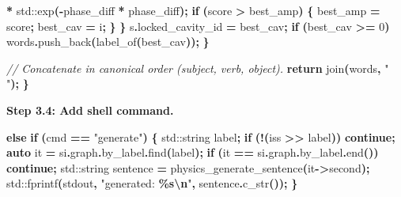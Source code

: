\documentclass[
  11pt,
  a4paper,
]{article}
\newenvironment{Shaded}{\begin{snugshade}}{\end{snugshade}}
\newcommand{\BuiltInTok}[1]{#1}
\newcommand{\CommentTok}[1]{\textcolor[rgb]{0.56,0.35,0.01}{\textit{#1}}}
\newcommand{\ControlFlowTok}[1]{\textcolor[rgb]{0.13,0.29,0.53}{\textbf{#1}}}
\newcommand{\DecValTok}[1]{\textcolor[rgb]{0.00,0.00,0.81}{#1}}
\newcommand{\KeywordTok}[1]{\textcolor[rgb]{0.13,0.29,0.53}{\textbf{#1}}}
\newcommand{\NormalTok}[1]{#1}
\newcommand{\OperatorTok}[1]{\textcolor[rgb]{0.81,0.36,0.00}{\textbf{#1}}}
\newcommand{\SpecialCharTok}[1]{\textcolor[rgb]{0.81,0.36,0.00}{\textbf{#1}}}
\newcommand{\StringTok}[1]{\textcolor[rgb]{0.31,0.60,0.02}{#1}}
\begin{document}
\begin{Shaded}
\begin{Highlighting}[]
                        \OperatorTok{*} \BuiltInTok{std::}\NormalTok{exp}\OperatorTok{({-}}\NormalTok{phase\_diff }\OperatorTok{*}\NormalTok{ phase\_diff}\OperatorTok{);}
            \ControlFlowTok{if} \OperatorTok{(}\NormalTok{score }\OperatorTok{\textgreater{}}\NormalTok{ best\_amp}\OperatorTok{)} \OperatorTok{\{}\NormalTok{ best\_amp }\OperatorTok{=}\NormalTok{ score}\OperatorTok{;}\NormalTok{ best\_cav }\OperatorTok{=}\NormalTok{ i}\OperatorTok{;} \OperatorTok{\}}
        \OperatorTok{\}}
\NormalTok{        s}\OperatorTok{.}\NormalTok{locked\_cavity\_id }\OperatorTok{=}\NormalTok{ best\_cav}\OperatorTok{;}
        \ControlFlowTok{if} \OperatorTok{(}\NormalTok{best\_cav }\OperatorTok{\textgreater{}=} \DecValTok{0}\OperatorTok{)}\NormalTok{ words}\OperatorTok{.}\NormalTok{push\_back}\OperatorTok{(}\NormalTok{label\_of}\OperatorTok{(}\NormalTok{best\_cav}\OperatorTok{));}
    \OperatorTok{\}}

    \CommentTok{// Concatenate in canonical order (subject, verb, object).}
    \ControlFlowTok{return}\NormalTok{ join}\OperatorTok{(}\NormalTok{words}\OperatorTok{,} \StringTok{" "}\OperatorTok{);}
\OperatorTok{\}}
\end{Highlighting}
\end{Shaded}

\textbf{Step 3.4: Add shell command.}

\begin{Shaded}
\begin{Highlighting}[]
\ControlFlowTok{else} \ControlFlowTok{if} \OperatorTok{(}\NormalTok{cmd }\OperatorTok{==} \StringTok{"generate"}\OperatorTok{)} \OperatorTok{\{}
    \BuiltInTok{std::}\NormalTok{string label}\OperatorTok{;}
    \ControlFlowTok{if} \OperatorTok{(!(}\NormalTok{iss }\OperatorTok{\textgreater{}\textgreater{}}\NormalTok{ label}\OperatorTok{))} \ControlFlowTok{continue}\OperatorTok{;}
    \KeywordTok{auto}\NormalTok{ it }\OperatorTok{=}\NormalTok{ si}\OperatorTok{.}\NormalTok{graph}\OperatorTok{.}\NormalTok{by\_label}\OperatorTok{.}\NormalTok{find}\OperatorTok{(}\NormalTok{label}\OperatorTok{);}
    \ControlFlowTok{if} \OperatorTok{(}\NormalTok{it }\OperatorTok{==}\NormalTok{ si}\OperatorTok{.}\NormalTok{graph}\OperatorTok{.}\NormalTok{by\_label}\OperatorTok{.}\NormalTok{end}\OperatorTok{())} \ControlFlowTok{continue}\OperatorTok{;}
    \BuiltInTok{std::}\NormalTok{string sentence }\OperatorTok{=}\NormalTok{ physics\_generate\_sentence}\OperatorTok{(}\NormalTok{it}\OperatorTok{{-}\textgreater{}}\NormalTok{second}\OperatorTok{);}
    \BuiltInTok{std::}\NormalTok{fprintf}\OperatorTok{(}\NormalTok{stdout}\OperatorTok{,} \StringTok{"generated: }\SpecialCharTok{\%s\textbackslash{}n}\StringTok{"}\OperatorTok{,}\NormalTok{ sentence}\OperatorTok{.}\NormalTok{c\_str}\OperatorTok{());}
\OperatorTok{\}}
\end{Highlighting}
\end{Shaded}
\end{document}
